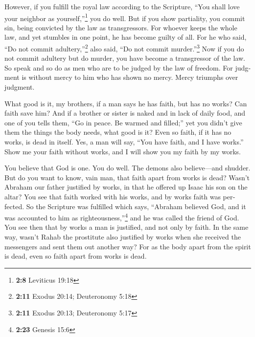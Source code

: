 \begin{paracol}{2}
\begin{otherlanguage}{english}
 However, if you fulfill the royal law according to the
Scripture, ``You shall love your neighbor as yourself,''\footnote{\textbf{2:8}
  Leviticus 19:18} you do well.  But if you show
partiality, you commit sin, being convicted by the law as transgressors.
 For whoever keeps the whole law, and yet stumbles in one
point, he has become guilty of all.  For he who said,
``Do not commit adultery,''\footnote{\textbf{2:11} Exodus 20:14;
  Deuteronomy 5:18} also said, ``Do not commit murder.''\footnote{\textbf{2:11}
  Exodus 20:13; Deuteronomy 5:17} Now if you do not commit adultery but
do murder, you have become a transgressor of the law.  So
speak and so do as men who are to be judged by the law of freedom.
 For judgment is without mercy to him who has shown no
mercy. Mercy triumphs over judgment.

 What good is it, my brothers, if a man says he has
faith, but has no works? Can faith save him?  And if a
brother or sister is naked and in lack of daily food, 
and one of you tells them, ``Go in peace. Be warmed and filled;'' yet
you didn't give them the things the body needs, what good is it?
 Even so faith, if it has no works, is dead in itself.
 Yes, a man will say, ``You have faith, and I have
works.'' Show me your faith without works, and I will show you my faith
by my works.

 You believe that God is one. You do well. The demons
also believe---and shudder.  But do you want to know,
vain man, that faith apart from works is dead?  Wasn't
Abraham our father justified by works, in that he offered up Isaac his
son on the altar?  You see that faith worked with his
works, and by works faith was perfected.  So the
Scripture was fulfilled which says, ``Abraham believed God, and it was
accounted to him as righteousness,''\footnote{\textbf{2:23} Genesis 15:6}
and he was called the friend of God.  You see then that
by works a man is justified, and not only by faith.  In
the same way, wasn't Rahab the prostitute also justified by works when
she received the messengers and sent them out another way?
 For as the body apart from the spirit is dead, even so
faith apart from works is dead.

\end{otherlanguage}


\end{paracol}
